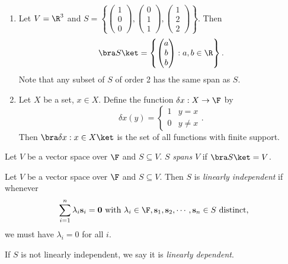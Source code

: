 \documentclass[a4paper]{article}
\begin{document}
\begin{eg}\leavevmode
  \begin{enumerate}
    \item Let $V = \R^3$ and $S = \left\{\begin{pmatrix}1\\0\\0\end{pmatrix}, \begin{pmatrix}0\\1\\1\end{pmatrix}, \begin{pmatrix}1\\2\\2\end{pmatrix}\right\}$. Then
      \[
        \bra S\ket = \left\{
          \begin{pmatrix}
            a\\b\\b\\
          \end{pmatrix}: a, b\in \R
        \right\}.
      \]
      Note that any subset of $S$ of order 2 has the same span as $S$.
    \item Let $X$ be a set, $x \in X$. Define the function $\delta x: X\to \F$ by
      \[
        \delta x(y) =
        \begin{cases}
          1 & y = x\\
          0 & y\not= x
        \end{cases}.
      \]
      Then $\bra \delta x: x \in X\ket$ is the set of all functions with finite support.
  \end{enumerate}
\end{eg}

\begin{defi}
  Let $V$ be a vector space over $\F$ and $S\subseteq V$. $S$ \emph{spans} $V$ if $\bra S\ket = V$.
\end{defi}

\begin{defi}
  Let $V$ be a vector space over $\F$ and $S\subseteq V$. Then $S$ is \emph{linearly independent} if whenever
  \[
    \sum_{i = 1}^n \lambda_i \mathbf{s}_i = \mathbf{0}\text{ with } \lambda_i \in \F, \mathbf{s}_1, \mathbf{s}_2, \cdots, \mathbf{s}_n \in S\text{ distinct},
  \]
  we must have $\lambda_i = 0$ for all $i$.

  If $S$ is not linearly independent, we say it is \emph{linearly dependent}.
\end{defi}
\end{document}

